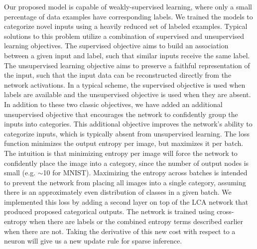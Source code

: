 Our proposed model is capable of weakly-supervised learning, where only a small percentage of data examples have corresponding labels. We trained the models to categorize novel inputs using a heavily reduced set of labeled examples. Typical solutions to this problem utilize a combination of supervised and unsupervised learning objectives. The supervised objective aims to build an association between a given input and label, such that similar inputs receive the same label. The unsupervised learning objective aims to preserve a faithful representation of the input, such that the input data can be reconstructed directly from the network activations. In a typical scheme, the supervised objective is used when labels are available and the unsupervised objective is used when they are absent. In addition to these two classic objectives, we have added an additional unsupervised objective that encourages the network to confidently group the inputs into categories. This additional objective improves the network’s ability to categorize inputs, which is typically absent from unsupervised learning. The loss function minimizes the output entropy per image, but maximizes it per batch. The intuition is that minimizing entropy per image will force the network to confidently place the image into a category, since the number of output nodes is small (e.g. $\sim$10 for MNIST). Maximizing the entropy across batches is intended to prevent the network from placing all images into a single category, assuming there is an approximately even distribution of classes in a given batch. We implemented this loss by adding a second layer on top of the LCA network that produced proposed categorical outputs. The network is trained using cross-entropy when there are labels or the combined entropy terms described earlier when there are not. Taking the derivative of this new cost with respect to a neuron will give us a new update rule for sparse inference.


